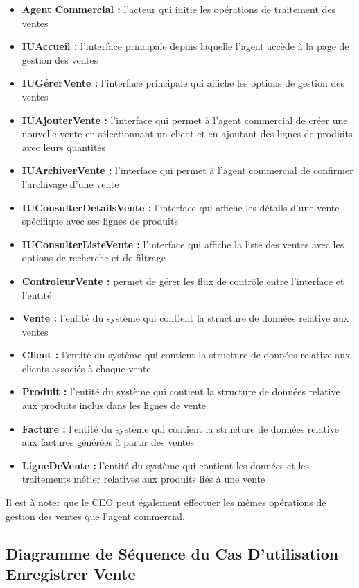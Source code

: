 \begin{itemize}[leftmargin=2em, topsep=4pt, itemsep=4pt]
  \item \textbf{Agent Commercial :} l'acteur qui initie les opérations de traitement des ventes
  \item \textbf{IUAccueil :} l'interface principale depuis laquelle l'agent accède à la page de gestion des ventes
  \item \textbf{IUGérerVente :} l'interface principale qui affiche les options de gestion des ventes
  \item \textbf{IUAjouterVente :} l'interface qui permet à l'agent commercial de créer une nouvelle vente en sélectionnant un client et en ajoutant des lignes de produits avec leurs quantités
  \item \textbf{IUArchiverVente :} l'interface qui permet à l'agent commercial de confirmer l'archivage d'une vente
  \item \textbf{IUConsulterDetailsVente :} l'interface qui affiche les détails d'une vente spécifique avec ses lignes de produits
  \item \textbf{IUConsulterListeVente :} l'interface qui affiche la liste des ventes avec les options de recherche et de filtrage
  \item \textbf{ControleurVente :} permet de gérer les flux de contrôle entre l'interface et l'entité
  \newpage
  \item \textbf{Vente :} l'entité du système qui contient la structure de données relative aux ventes
  \item \textbf{Client :} l'entité du système qui contient la structure de données relative aux clients associés à chaque vente
  \item \textbf{Produit :} l'entité du système qui contient la structure de données relative aux produits inclus dans les lignes de vente
  \item \textbf{Facture :} l'entité du système qui contient la structure de données relative aux factures générées à partir des ventes
  \item \textbf{LigneDeVente :} l'entité du système qui contient les données et les  traitements métier relatives aux produits liés à une vente
\end{itemize}

Il est à noter que le CEO peut également effectuer les mêmes opérations de gestion des ventes que l'agent commercial.

\subsection{Diagramme de Séquence du Cas D'utilisation Enregistrer Vente}

